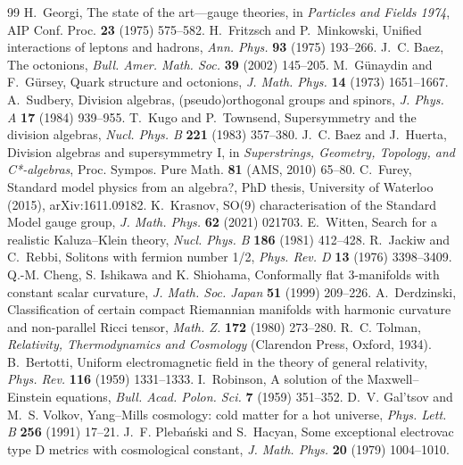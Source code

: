 \begin{thebibliography}{99}
 H.~Georgi, The state of the art---gauge theories, in \emph{Particles and Fields 1974}, AIP Conf. Proc. \textbf{23} (1975) 575--582.
 H.~Fritzsch and P.~Minkowski, Unified interactions of leptons and hadrons, \emph{Ann. Phys.} \textbf{93} (1975) 193--266.
 J.~C. Baez, The octonions, \emph{Bull. Amer. Math. Soc.} \textbf{39} (2002) 145--205.
 M.~G\"unaydin and F.~G\"ursey, Quark structure and octonions, \emph{J. Math. Phys.} \textbf{14} (1973) 1651--1667.
 A.~Sudbery, Division algebras, (pseudo)orthogonal groups and spinors, \emph{J. Phys. A} \textbf{17} (1984) 939--955.
 T.~Kugo and P.~Townsend, Supersymmetry and the division algebras, \emph{Nucl. Phys. B} \textbf{221} (1983) 357--380.
 J.~C. Baez and J.~Huerta, Division algebras and supersymmetry I, in \emph{Superstrings, Geometry, Topology, and C*-algebras}, Proc. Sympos. Pure Math. \textbf{81} (AMS, 2010) 65--80.
 C.~Furey, Standard model physics from an algebra?, PhD thesis, University of Waterloo (2015), arXiv:1611.09182.
 K.~Krasnov, SO(9) characterisation of the Standard Model gauge group, \emph{J. Math. Phys.} \textbf{62} (2021) 021703.
 E.~Witten, Search for a realistic Kaluza--Klein theory, \emph{Nucl. Phys. B} \textbf{186} (1981) 412--428.
 R.~Jackiw and C.~Rebbi, Solitons with fermion number 1/2, \emph{Phys. Rev. D} \textbf{13} (1976) 3398--3409.
 Q.-M. Cheng, S. Ishikawa and K. Shiohama, Conformally flat 3-manifolds with constant scalar curvature, \emph{J. Math. Soc. Japan} \textbf{51} (1999) 209--226.
 A.~Derdzinski, Classification of certain compact Riemannian manifolds with harmonic curvature and non-parallel Ricci tensor, \emph{Math. Z.} \textbf{172} (1980) 273--280.
 R.~C. Tolman, \emph{Relativity, Thermodynamics and Cosmology} (Clarendon Press, Oxford, 1934).
 B.~Bertotti, Uniform electromagnetic field in the theory of general relativity, \emph{Phys. Rev.} \textbf{116} (1959) 1331--1333.
 I.~Robinson, A solution of the Maxwell--Einstein equations, \emph{Bull. Acad. Polon. Sci.} \textbf{7} (1959) 351--352.
 D.~V. Gal'tsov and M.~S. Volkov, Yang--Mills cosmology: cold matter for a hot universe, \emph{Phys. Lett. B} \textbf{256} (1991) 17--21.
 J.~F. Pleba\'nski and S.~Hacyan, Some exceptional electrovac type D metrics with cosmological constant, \emph{J. Math. Phys.} \textbf{20} (1979) 1004--1010.

\end{thebibliography}
